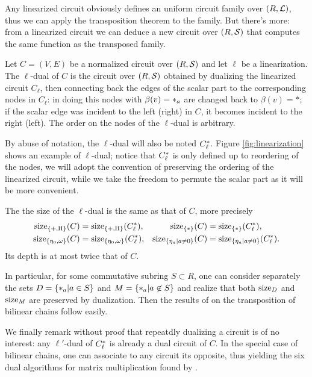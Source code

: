Any linearized circuit obviously defines an uniform circuit family
over $(R,\mathcal{L})$, thus we can apply the transposition theorem to the
family. But there's more: from a linearized circuit we can deduce a
new circuit over $(R,\mathcal{S})$ that computes the same function as the
transposed family.

\begin{definition}
  \label{def:ell-dual}
  Let $C=(V,E)$ be a normalized circuit over $(R,\mathcal{S})$ and let
  $\ell$ be a linearization.  The $\ell$-dual of $C$ is the circuit
  over $(R,\mathcal{S})$ obtained by dualizing the linearized circuit
  $C_\ell$, then connecting back the edges of the scalar part to the
  corresponding nodes in $C_\ell$: in doing this nodes with
  $\beta(v)=*_{a}$ are changed back to $\beta(v)=*$; if the scalar
  edge was incident to the left (right) in $C$, it becomes incident to
  the right (left). The order on the nodes of the $\ell$-dual is
  arbitrary.
\end{definition}

By abuse of notation, the $\ell$-dual will also be noted
$C_\ell^\ast$. Figure \ref{fig:linearization} shows an example of
$\ell$-dual; notice that $C_\ell^\ast$ is only defined up to
reordering of the nodes, we will adopt the convention of preserving
the ordering of the linearized circuit, while we take the freedom to
permute the scalar part as it will be more convenient.

\begin{proposition}
  The the size of the $\ell$-dual is the same as that of $C$, more
  precisely
  \begin{align*}
    \operatorname{size}_{\{+,\operatorname{H}\}}(C) &= \operatorname{size}_{\{+,\operatorname{H}\}}(C_\ell^\ast), 
    &\operatorname{size}_{\{*\}}(C) &= \operatorname{size}_{\{*\}}(C_\ell^\ast),\\
    \operatorname{size}_{\{\eta_0,\omega\}}(C) &= \operatorname{size}_{\{\eta_0,\omega\}}(C_\ell^\ast), 
    &\operatorname{size}_{\{\eta_a|a\ne0\}}(C) &= \operatorname{size}_{\{\eta_a|a\ne0\}}(C_\ell^\ast).
  \end{align*}
  Its depth is at most twice that of $C$.
\end{proposition}

In particular, for some commutative subring $S\subset R$, one can
consider separately the sets $D=\{*_{a}|a\in S\}$ and
$M=\{*_{a}|a\not\in S\}$ and realize that both $\operatorname{size}_D$ and
$\operatorname{size}_M$ are preserved by dualization. Then the results of
\cite{HoMu73,Fid73} on the transposition of bilinear chains follow
easily.

We finally remark without proof that repeatdly dualizing a circuit is
of no interest: any $\ell'$-dual of $C_\ell^\ast$ is already a dual
circuit of $C$. In the special case of bilinear chains, one can
associate to any circuit its opposite, thus yielding the six dual
algorithms for matrix multiplication found by \cite{HoMu73}.

%
